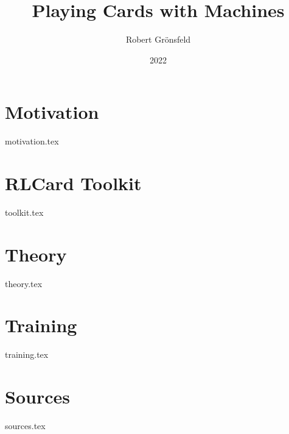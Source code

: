 \documentclass[aspectratio=169,table,svgnames]{beamer}
\title{Playing Cards with Machines}
\author{Robert Grönsfeld}
\institute{Baloise}
\date{2022}
\begin{document}
\frame{\titlepage}

\section{Motivation}
{motivation.tex}
\section{RLCard Toolkit}
{toolkit.tex}
\section{Theory}
{theory.tex}
\section{Training}
{training.tex}
\section{Sources}
{sources.tex}
\end{document}
